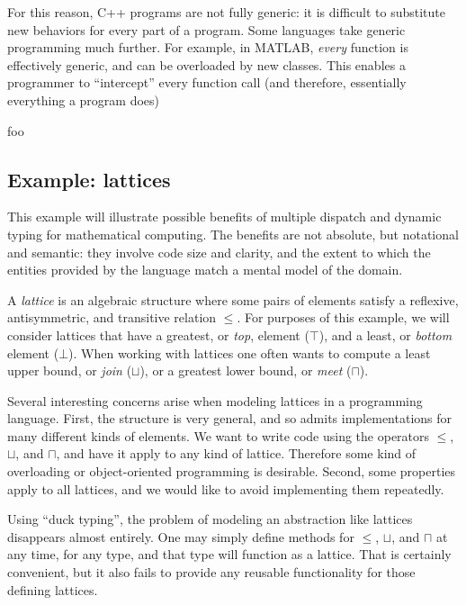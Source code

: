 For this reason, C++ programs are not fully generic: it is difficult to
substitute new behaviors for every part of a program. Some languages
take generic programming much further. For example, in MATLAB, \emph{every}
function is effectively generic, and can be overloaded by new classes.
This enables a programmer to ``intercept'' every function call (and therefore,
essentially everything a program does)

foo

\subsection{Example: lattices}

This example will illustrate possible benefits of multiple dispatch and
dynamic typing for mathematical computing.
The benefits are not absolute, but notational and semantic:
they involve code size and clarity, and the extent to which the entities
provided by the language match a mental model of the domain.

A \emph{lattice} is an algebraic structure where some pairs of elements
satisfy a reflexive, antisymmetric, and transitive relation $\leq$.
For purposes of this example, we will consider lattices that have
a greatest, or \emph{top}, element ($\top$), and a least, or \emph{bottom}
element ($\bot$). When working with lattices one often wants to compute
a least upper bound, or \emph{join} ($\sqcup$), or a greatest lower bound,
or \emph{meet} ($\sqcap$).

Several interesting concerns arise when modeling lattices in a programming
language. First, the structure is very general, and so admits implementations
for many different kinds of elements. We want to write code using
the operators $\leq$, $\sqcup$, and $\sqcap$, and have it apply to any kind
of lattice. Therefore some kind of overloading or object-oriented programming
is desirable. Second, some properties apply to all lattices, and we would
like to avoid implementing them repeatedly.

Using ``duck typing'', the problem of modeling an abstraction like lattices
disappears almost entirely. One may simply define methods for
$\leq$, $\sqcup$, and $\sqcap$ at any time, for any type, and that type will
function as a lattice. That is certainly convenient, but it also fails to
provide any reusable functionality for those defining lattices.

